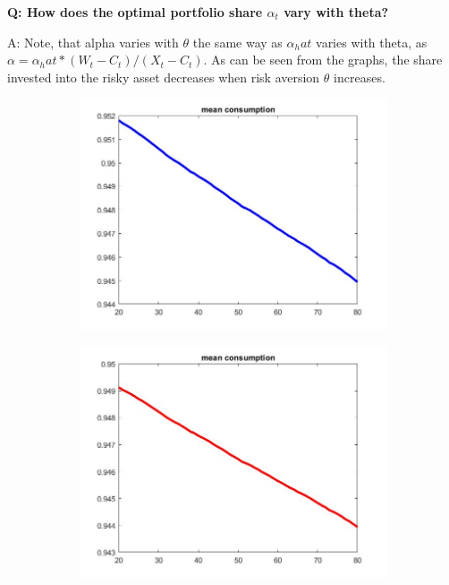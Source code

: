 \documentclass[12pt,a4paper]{article}
\begin{document}
\textbf{Q: How does the optimal portfolio share $\alpha_t$ vary with theta? }

A: Note, that alpha varies with $\theta$ the same way as $\alpha_hat$ varies with theta, as $\alpha = \alpha_hat * (W_t - C_t)/ (X_t - C_t)$. As can be seen from the graphs, the share invested into the risky asset decreases when risk aversion $\theta$ increases.

\begin{figure}[h!]
  \centering
  \begin{subfigure}[b]{0.32\linewidth}
    \includegraphics[width=\linewidth]{graphs/Q2/mean_cons.jpg}
  \end{subfigure}
  \begin{subfigure}[b]{0.32\linewidth}
      \includegraphics[width=\linewidth]{graphs/Q2/mean_cons2.jpg}

\end{subfigure}
\end{figure}
\end{document}
